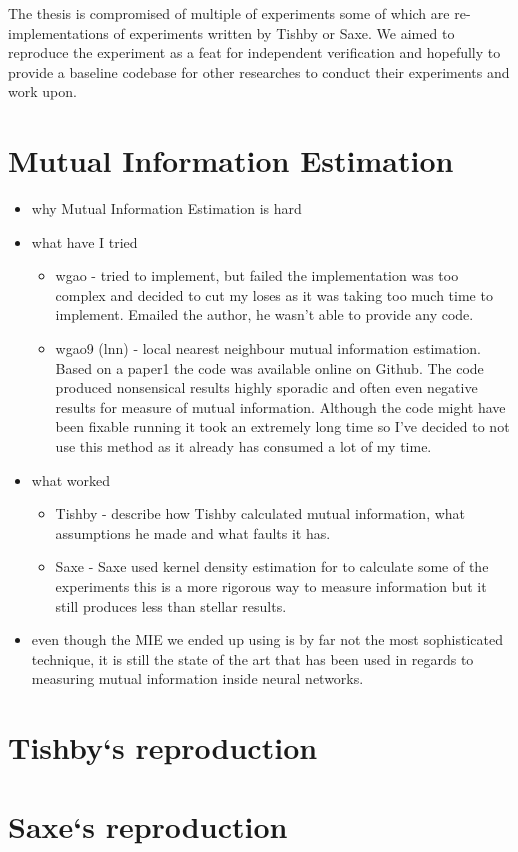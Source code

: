 
The thesis is compromised of multiple of experiments some of which are
re-implementations of experiments written by Tishby or Saxe. We aimed to
reproduce the experiment as a feat for independent verification and hopefully to
provide a baseline codebase for other researches to conduct their experiments
and work upon.


\section{Mutual Information Estimation}


\begin{itemize}
  \item{
      why Mutual Information Estimation is hard
    }
  \item{
      what have I tried
      \begin{itemize}
        \item{
            wgao - tried to implement, but failed the implementation was too
            complex and decided to cut my loses as it was taking too much time
            to implement. Emailed the author, he wasn't able to provide any
            code.
          }
        \item{
            wgao9 (lnn) - local nearest neighbour mutual information estimation.
            Based on a paper1 the code was available online on Github.
            The code produced nonsensical results highly sporadic and often even
            negative results for measure of mutual information. Although the
            code might have been fixable running it took an extremely long time
            so I've decided to not use this method as it already has consumed a
            lot of my time.
          }
      \end{itemize}
    }
  \item{
      what worked
      \begin{itemize}
        \item{
            Tishby - describe how Tishby calculated mutual information, what
            assumptions he made and what faults it has.
          }
        \item{
            Saxe - Saxe used kernel density estimation for to calculate some of
            the experiments this is a more rigorous way to measure information
            but it still produces less than stellar results.
          }
      \end{itemize}
    }
  \item{
      even though the MIE we ended up using is by far not the most sophisticated
      technique, it is still the state of the art that has been used in regards
      to measuring mutual information inside neural networks.
    }
\end{itemize}
    


\section{Tishby`s reproduction}
\section{Saxe`s reproduction}

